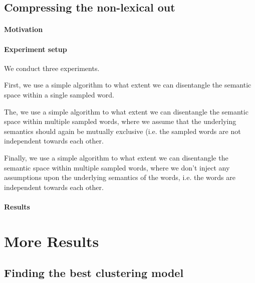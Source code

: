 \documentclass[a4paper,12pt,twoside,openright]{report}
\begin{document}

\section{Compressing the non-lexical out}
\subsubsection{Motivation}
\subsubsection{Experiment setup}


We conduct three experiments.

First, we use a simple algorithm to what extent we can disentangle the semantic space within a single sampled word.

The, we use a simple algorithm to what extent we can disentangle the semantic space within multiple sampled words, where we assume that the underlying semantics should again be mutually exclusive (i.e. the sampled words are not independent towards each other.

Finally, we use a simple algorithm to what extent we can disentangle the semantic space within multiple sampled words, where we don't inject any assumptions upon the underlying semantics of the words, i.e. the words are independent towards each other.


\subsubsection{Results}




\chapter{More Results}

\section{Finding the best clustering model}\label{section:more_clustering_results}
\end{document}
